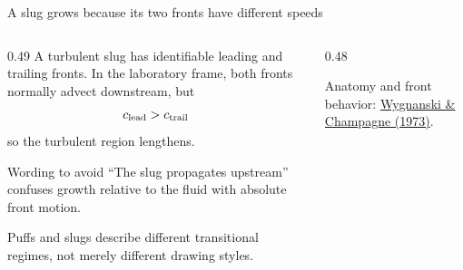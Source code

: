 \documentclass[aspectratio=169,11pt]{beamer}
\begin{document}
\begin{frame}{A slug grows because its two fronts have different speeds}
\begin{columns}[T,onlytextwidth]
\begin{column}{0.49\textwidth}
A turbulent slug has identifiable leading and trailing fronts. In the laboratory frame, both fronts normally advect downstream, but
\[
  c_{\rm lead}>c_{\rm trail}
\]
so the turbulent region lengthens.

\begin{alertblock}{Wording to avoid}
``The slug propagates upstream'' confuses growth relative to the fluid with absolute front motion.
\end{alertblock}

Puffs and slugs describe different transitional regimes, not merely different drawing styles.
\end{column}
\begin{column}{0.48\textwidth}
\centering
{}

\vspace{0.25em}
{\scriptsize Anatomy and front behavior: \href{https://doi.org/10.1017/S0022112073001576}{Wygnanski \& Champagne (1973)}.\par}
\end{column}
\end{columns}
\end{frame}
\end{document}
